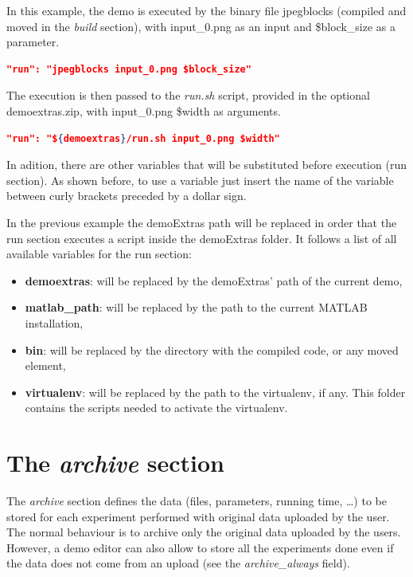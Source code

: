 In this example, the demo is executed by the binary file jpegblocks (compiled and moved in the \emph{build} section), with input\_0.png as an input and \$block\_size as a parameter.
\begin{lstlisting}[language=json,firstnumber=1]
  "run": "jpegblocks input_0.png $block_size"\end{lstlisting}

The execution is then passed to the \emph{run.sh} script, provided in the optional demoextras.zip, with input\_0.png \$width as arguments.
\begin{lstlisting}[language=json,firstnumber=1]
  "run": "${demoextras}/run.sh input_0.png $width"
\end{lstlisting}

In adition, there are other variables that will be substituted before execution (run section). As shown before, to use a variable just insert the name of the variable between curly brackets preceded by a dollar sign.

In the previous example the demoExtras path will be replaced in order that the run section executes a script inside the demoExtras folder. It follows a list of all available variables for the run section:

\begin{itemize}
  \item \textbf{demoextras}: will be replaced by the demoExtras' path of the current demo,
  \item \textbf{matlab\_path}: will be replaced by the path to the current MATLAB installation,
  \item \textbf{bin}: will be replaced by the directory with the compiled code, or any moved element,
  \item \textbf{virtualenv}: will be replaced by the path to the virtualenv, if any. This folder contains the scripts needed to activate the virtualenv.
\end{itemize}


\section{The \emph{archive} section}

The \emph{archive} section defines the data (files, parameters, running time, \dots) to be stored for each experiment performed with original data uploaded by the user. The normal behaviour is to archive only the original data uploaded by the users. However, a demo editor can also allow to store all the experiments done even if the data does not come from an upload (see the \emph{archive\_always} field).

